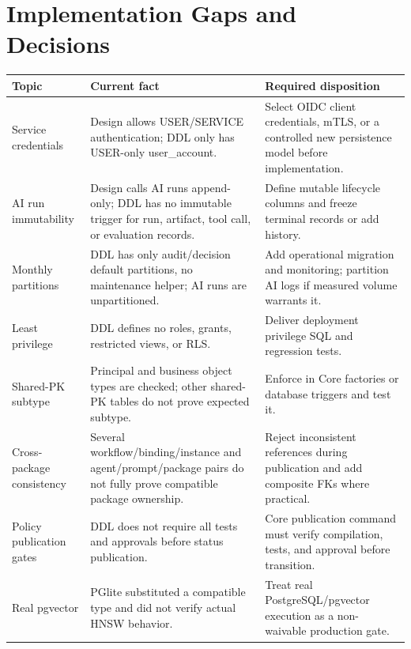 \documentclass[journal,a4paper,onecolumn]{IEEEtran}
\begin{document}
\section{Implementation Gaps and Decisions}
\begin{longtable}{p{}p{}p{}}
\toprule
Topic & Current fact & Required disposition \\
\midrule
\endhead
Service credentials & Design allows USER/SERVICE authentication; DDL only has USER-only user\_account. & Select OIDC client credentials, mTLS, or a controlled new persistence model before implementation.\\
AI run immutability & Design calls AI runs append-only; DDL has no immutable trigger for run, artifact, tool call, or evaluation records. & Define mutable lifecycle columns and freeze terminal records or add history.\\
Monthly partitions & DDL has only audit/decision default partitions, no maintenance helper; AI runs are unpartitioned. & Add operational migration and monitoring; partition AI logs if measured volume warrants it.\\
Least privilege & DDL defines no roles, grants, restricted views, or RLS. & Deliver deployment privilege SQL and regression tests.\\
Shared-PK subtype & Principal and business object types are checked; other shared-PK tables do not prove expected subtype. & Enforce in Core factories or database triggers and test it.\\
Cross-package consistency & Several workflow/binding/instance and agent/prompt/package pairs do not fully prove compatible package ownership. & Reject inconsistent references during publication and add composite FKs where practical.\\
Policy publication gates & DDL does not require all tests and approvals before status publication. & Core publication command must verify compilation, tests, and approval before transition.\\
Real pgvector & PGlite substituted a compatible type and did not verify actual HNSW behavior. & Treat real PostgreSQL/pgvector execution as a non-waivable production gate.\\
\bottomrule
\end{longtable}
\end{document}
